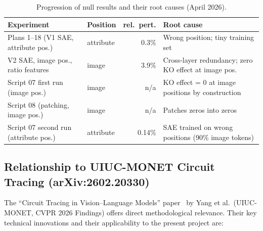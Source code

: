 \documentclass[11pt,a4paper]{article}
\begin{document}
\begin{table}[ht]
\centering
\caption{Progression of null results and their root causes (April 2026).}
\label{tab:null_progression}
\begin{tabular}{p{4.8cm}p{2.2cm}rp{4.5cm}}
\toprule
Experiment & Position & rel.\ pert. & Root cause \\
\midrule
Plans 1--18 (V1 SAE, attribute pos.) & attribute & 0.3\% & Wrong position; tiny training set \\
V2 SAE, image pos., ratio features   & image      & 3.9\% & Cross-layer redundancy; zero KO effect at image pos. \\
Script 07 first run (image pos.)      & image      & n/a   & KO effect = 0 at image positions by construction \\
Script 08 (patching, image pos.)      & image      & n/a   & Patches zeros into zeros \\
Script 07 second run (attribute pos.) & attribute  & 0.14\% & SAE trained on wrong positions (90\% image tokens) \\
\bottomrule
\end{tabular}
\end{table}

\subsection{Relationship to UIUC-MONET Circuit Tracing (arXiv:2602.20330)}

The ``Circuit Tracing in Vision--Language Models'' paper~\citep{yang2026circuitvlm} by Yang
et al.\ (UIUC-MONET, CVPR 2026 Findings) offers direct methodological relevance.
Their key technical innovations and their applicability to the present project are:
\end{document}
